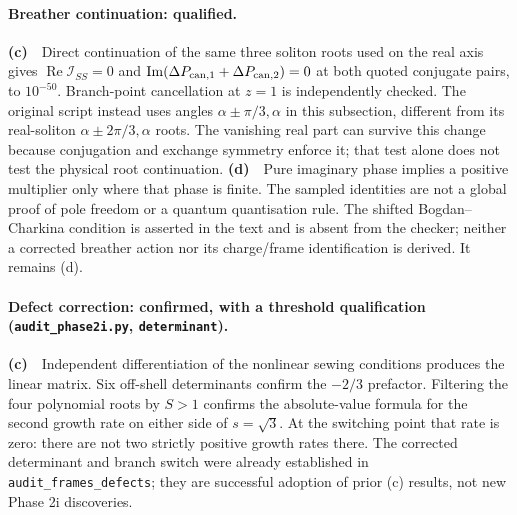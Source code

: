 \documentclass[11pt,a4paper]{article}
\newcommand{\Lc}{\textbf{(c)}\ }
\newcommand{\Ld}{\textbf{(d)}\ }
\newcommand{\scr}{\texttt{audit\_\allowbreak phase2i.py}}
\begin{document}
\paragraph{Breather continuation: qualified.}
\Lc\ Direct continuation of the same three soliton roots used on the real
axis gives $\operatorname{Re}\mathcal I_{SS}=0$ and
$\operatorname{Im}(\Delta P_{\rm can,1}+\Delta P_{\rm can,2})=0$ at both
quoted conjugate pairs, to $10^{-50}$. Branch-point cancellation at $z=1$
is independently checked. The original script instead uses angles
$\alpha\pm\pi/3,\alpha$ in this subsection, different from its real-soliton
$\alpha\pm2\pi/3,\alpha$ roots. The vanishing real part can survive this
change because conjugation and exchange symmetry enforce it; that test alone
does not test the physical root continuation. \Ld\ Pure imaginary phase implies
a positive multiplier only where that phase is finite. The sampled identities
are not a global proof of pole freedom or a quantum quantisation rule.
The shifted Bogdan--Charkina condition is asserted in the text and is absent
from the checker; neither a corrected breather action nor its charge/frame
identification is derived. It remains (d).

\paragraph{Defect correction: confirmed, with a threshold qualification (\scr, \texttt{determinant}).}
\Lc\ Independent differentiation of the nonlinear sewing conditions produces
the linear matrix. Six off-shell determinants confirm the $-2/3$ prefactor.
Filtering the four polynomial roots by $S>1$ confirms the absolute-value
formula for the second growth rate on either side of $s=\sqrt3$.
At the switching point that rate is zero: there are not two strictly positive
growth rates there. The corrected determinant and branch switch were already
established in \texttt{audit\_frames\_defects}; they are successful adoption
of prior (c) results, not new Phase 2i discoveries.
\end{document}
